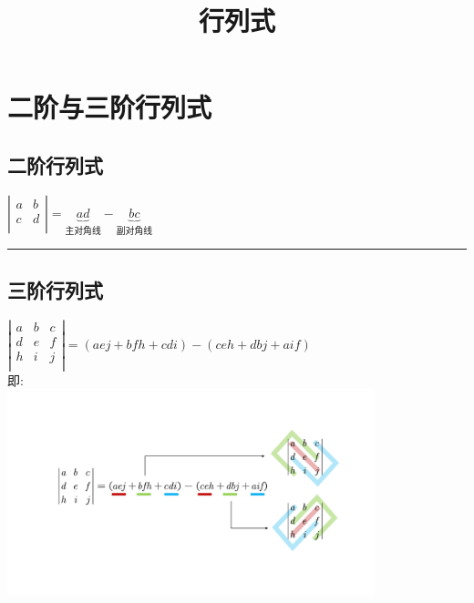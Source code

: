 \documentclass[UTF8]{ctexart}
\title{行列式}
\begin{document}
	\tableofcontents %
	\date{} %
	\maketitle  %
	
	
	
	
	\section{二阶与三阶行列式}
	
	\subsection{二阶行列式}
	
	$
	\left| \begin{matrix}
		a&		b\\
		c&		d\\
	\end{matrix} \right|=\underset{\text{主对角线}}{\underbrace{ad}}-\underset{\text{副对角线}}{\underbrace{bc}}
	$
	

	\hrule

	
		\subsection{三阶行列式}
	$
	\left| \begin{matrix}
		a&		b&		c\\
		d&		e&		f\\
		h&		i&		j\\
	\end{matrix} \right|=\left( aej+bfh+cdi \right) -\left( ceh+dbj+aif \right) 
	$ \\
	
	即: \\
	\includegraphics[width=0.8\textwidth]{img/0001.pdf}\\
	
\end{document}
